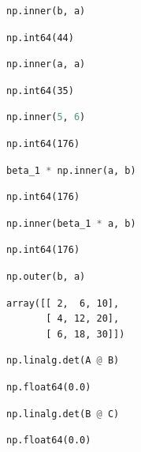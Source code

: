 \documentclass[11pt,letterpaper]{article}
\begin{document}
\begin{enumerate}
\begin{enumerate}
\begin{lstlisting}[language=python]
    np.inner(b, a)
\end{lstlisting}
\begin{verbatim}
np.int64(44)
\end{verbatim}
\begin{lstlisting}[language=python]
    np.inner(a, a)
\end{lstlisting}
\begin{verbatim}
np.int64(35)
\end{verbatim}
\begin{lstlisting}[language=python]
    np.inner(5, 6)
\end{lstlisting}
\begin{verbatim}
np.int64(176)
\end{verbatim}
\begin{lstlisting}[language=python]
    beta_1 * np.inner(a, b)
\end{lstlisting}
\begin{verbatim}
np.int64(176)
\end{verbatim}
\begin{lstlisting}[language=python]
    np.inner(beta_1 * a, b)
\end{lstlisting}
\begin{verbatim}
np.int64(176)
\end{verbatim}
\begin{lstlisting}[language=python]
    np.outer(b, a)
\end{lstlisting}
\begin{verbatim}
array([[ 2,  6, 10],
       [ 4, 12, 20],
       [ 6, 18, 30]])
\end{verbatim}
\begin{lstlisting}[language=python]
np.linalg.det(A @ B)
\end{lstlisting}
\begin{verbatim}
np.float64(0.0)
\end{verbatim}
\begin{lstlisting}[language=python]
np.linalg.det(B @ C)
\end{lstlisting}
\begin{verbatim}
np.float64(0.0)
\end{verbatim}
\end{enumerate}
\end{enumerate}
\end{document}
